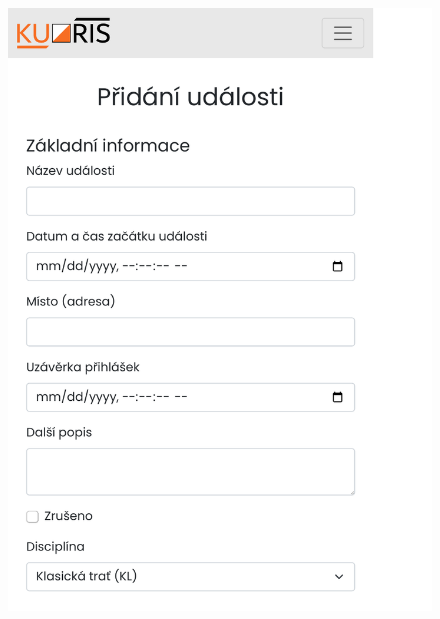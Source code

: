 \begin{figure}[h]
\begin{minipage}[b]{0.48\linewidth}
        \includegraphics[width=0.99\linewidth, cfbox=kuorisgray 0.5pt 0pt]{images/form-responsive-layout.pdf}
    \end{minipage}
\end{figure}
